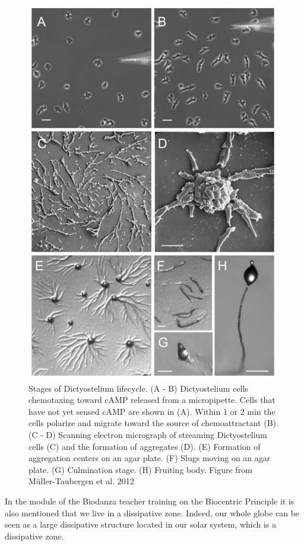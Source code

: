 \documentclass[
  11pt,
]{book}
\begin{document}
\begin{figure}

{\centering \includegraphics[width=0.6\linewidth]{./figs/Dictyostelida} 

}

\caption{Stages of Dictyostelium lifecycle. (A - B) Dictyostelium cells chemotaxing toward cAMP released from a micropipette. Cells that have not yet sensed cAMP are shown in (A). Within 1 or 2 min the cells polarize and migrate toward the source of chemoattractant (B). (C - D) Scanning electron micrograph of streaming Dictyostelium cells (C) and the formation of aggregates (D). (E) Formation of aggregation centers on an agar plate. (F) Slugs moving on an agar plate. (G) Culmination stage. (H) Fruiting body. Figure from Müller-Taubergen et al. 2012}\label{fig:Dictyostelium}
\end{figure}

In the module of the Biodanza teacher training on the Biocentric Principle it is also mentioned that we live in a dissipative zone. Indeed, our whole globe can be seen as a large dissipative structure located in our solar system, which is a dissipative zone.
\end{document}
